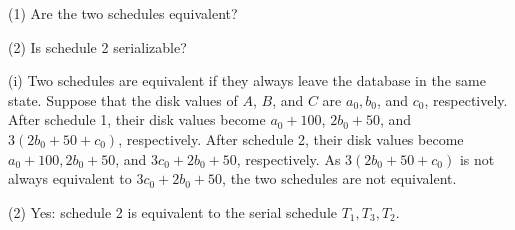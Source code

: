 (1) Are the two schedules equivalent?

(2) Is schedule 2 serializable?

\begin{sol}
     (i) Two schedules are equivalent if they always leave the database in the same state. Suppose that the disk values of $A$, $B$, and $C$ are $a_0, b_0$, and $c_0$, respectively. After schedule 1, their disk values become $a_0 + 100$, $2b_0 + 50$, and $3(2b_0 + 50 + c_0)$, respectively. After schedule 2, their disk values become $a_0 + 100, 2b_0 + 50$, and $3c_0 + 2b_0 + 50$, respectively. As $3(2b_0 + 50 + c_0)$ is not always equivalent to $3c_0 + 2b_0 + 50$, the two schedules are not equivalent.

    \vgap

    (2) Yes: schedule 2 is equivalent to the serial schedule $T_1, T_3, T_2$.
\end{sol}




